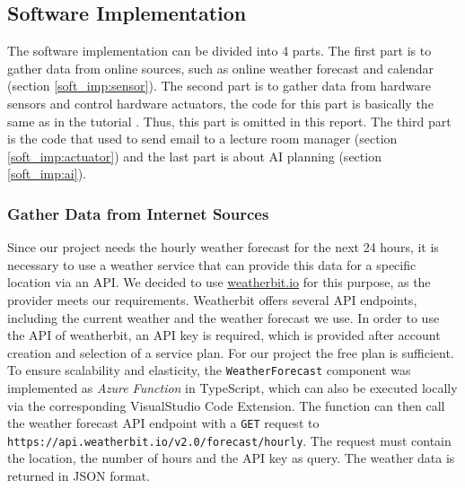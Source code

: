 \documentclass[runningheads]{llncs}
\begin{document}
\subsection{Software Implementation}
\label{imp:soft_imp}
The software implementation can be divided into 4 parts. The first part is to gather data from online sources, such as online weather forecast and calendar (section \ref{soft_imp:sensor}). The second part is to gather data from hardware sensors and control hardware actuators, the code for this part is basically the same as in the tutorial \cite{th_tutorial,l_tutorial,m_tutorial,led_tutorial}. Thus, this part is omitted in this report. The third part is the code that used to send email to a lecture room manager (section \ref{soft_imp:actuator}) and the last part is about AI planning (section \ref{soft_imp:ai}).

\subsubsection{Gather Data from Internet Sources}\hfill
\label{soft_imp:sensor}
\newline
Since our project needs the hourly weather forecast for the next 24 hours, it is necessary to use a weather service that can provide this data for a specific location via an API.
We decided to use \url{weatherbit.io} for this purpose, as the provider meets our requirements.
Weatherbit offers several API endpoints, including the current weather and the weather forecast we use.
In order to use the API of weatherbit, an API key is required, which is provided after account creation and selection of a service plan.
For our project the free plan is sufficient.
To ensure scalability and elasticity, the \texttt{WeatherForecast} component was implemented as \textit{Azure Function} in TypeScript, which can also be executed locally via the corresponding VisualStudio Code Extension.
The function can then call the weather forecast API endpoint with a \texttt{GET} request to \texttt{https://api.weatherbit.io/v2.0/forecast/hourly}.
The request must contain the location, the number of hours and the API key as query.
The weather data is returned in JSON format.
\end{document}

